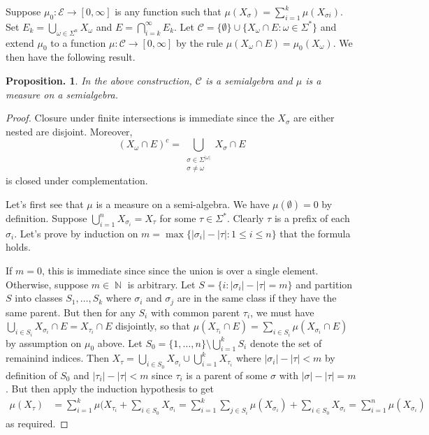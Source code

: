 \documentclass[11pt, a4paper]{memoir}
\DeclareMathOperator{\N}{{\mathbb{N}}}
\theoremstyle{change}
\newtheorem{proposition}[theorem]{Proposition.}
\theoremstyle{plain}
\theoremstyle{nonumberplain}
\newtheorem{proof}{Proof}
\numberwithin{equation}{section}
\begin{document}
Suppose $\mu_0:\mathcal{E}\to[0,\infty]$ is any function such that $\mu(X_\sigma)=\sum_{i=1}^k\mu(X_{\sigma i})$.
Set $E_k=\bigcup_{\omega\in\Sigma^n}X_\omega$ and $E=\bigcap_{i=k}^\infty E_k$.
Let $\mathcal{C}=\{\emptyset\}\cup\{X_\omega\cap E:\omega\in\Sigma^*\}$ and extend $\mu_0$ to a function $\mu:\mathcal{C}\to[0,\infty]$ by the rule $\mu(X_\omega\cap E)=\mu_0(X_\omega)$.
We then have the following result.
\begin{proposition}
    In the above construction, $\mathcal{C}$ is a semialgebra and $\mu$ is a measure on a semialgebra.
\end{proposition}
\begin{proof}
    Closure under finite intersections is immediate since the $X_\sigma$ are either nested are disjoint.
    Moreover,
    \begin{equation*}
        (X_\omega\cap E)^c=\bigcup_{\substack{\sigma\in\Sigma^{|\omega|}\\\sigma\neq\omega}}X_\sigma\cap E
    \end{equation*}
    is closed under complementation.

    Let's first see that $\mu$ is a measure on a semi-algebra.
    We have $\mu(\emptyset)=0$ by definition.
    Suppose $\bigcup_{i=1}^n X_{\sigma_i}=X_\tau$ for some $\tau\in\Sigma^*$.
    Clearly $\tau$ is a prefix of each $\sigma_i$.
    Let's prove by induction on $m=\max\{|\sigma_i|-|\tau|:1\leq i\leq n\}$ that the formula holds.

    If $m=0$, this is immediate since since the union is over a single element.
    Otherwise, suppose $m\in\N$ is arbitrary.
    Let $S = \{i:|\sigma_i|-|\tau|=m\}$ and partition $S$ into classes $S_1,\ldots,S_k$ where $\sigma_i$ and $\sigma_j$ are in the same class if they have the same parent.
    But then for any $S_i$ with common parent $\tau_i$, we must have $\bigcup_{i\in S_i}X_{\sigma_i}\cap E=X_{\tau_i}\cap E$ disjointly, so that $\mu(X_{\tau_i}\cap E)=\sum_{i\in S_i}\mu(X_{\sigma_i}\cap E)$ by assumption on $\mu_0$ above.
    Let $S_0=\{1,\ldots,n\}\setminus\bigcup_{i=1}^k S_i$ denote the set of remainind indices.
    Then $X_\tau=\bigcup_{i\in S_0}X_{\sigma_i}\cup\bigcup_{i=1}^k X_{\tau_i}$ where $|\sigma_i|-|\tau|<m$ by definition of $S_0$ and $|\tau_i|-|\tau|<m$ since $\tau_i$ is a parent of some $\sigma$ with $|\sigma|-|\tau|=m$.
    But then apply the induction hypothesis to get
    \begin{align*}
        \mu(X_\tau) &= \sum_{i=1}^k\mu(X_{\tau_i}+\sum_{i\in S_0}X_{\sigma_i}=\sum_{i=1}^k\sum_{j\in S_i}\mu(X_{\sigma_i})+\sum_{i\in S_0}X_{\sigma_i}= \sum_{i=1}^n \mu(X_{\sigma_i})
    \end{align*}
    as required.


\end{proof}
\end{document}
